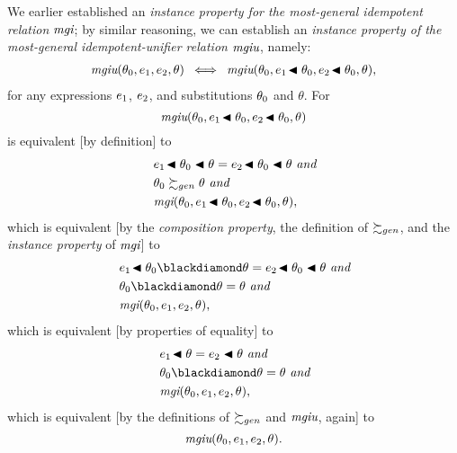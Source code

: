 \documentclass[runningheads]{llncs}
\DeclareMathOperator{\uand}{\emph{and}\,}
\DeclareMathOperator{\uiff}{\iff}
\DeclareMathOperator{\mgi}{\emph{mgi}}
\DeclareMathOperator{\mgiu}{\emph{mgiu}}
\begin{document}
We earlier established an \emph{instance property for the most-general idempotent relation} ${\mgi}$; by similar reasoning, we can establish an \emph{instance property of the most-general idempotent-unifier relation \emph{$\mgiu$}}, namely:
   \begin{align*}
 {\mgiu}(\thet{0}, \e{1}, \e{2}, \theta) \,\, \uiff \,\, 
  {\mgiu}(\thet{0}, \e{1}\!\apply\thet{0}, \e{2}\!\apply\thet{0}, \theta),
 \end{align*}
for any expressions $e_{1}$, $e_{2}$, and substitutions $\theta_{0}$ and $\theta$. For
\[ {\mgiu}(\thet{0}, \e{1}\!\apply\thet{0}, \e{2}\!\apply\thet{0}, \theta)\]
\noindent is equivalent [by definition] to
\[\begin{aligned}
&\e{1}\!\apply\thet{0}\apply \theta = \e{2}\!\apply\thet{0} \apply \theta \, \uand 
 \\
 \,\, & \thet{0} \moregen \theta \, \uand
\\
  \,\, & {\mgi}(\thet{0}, \e{1}\!\apply\thet{0}, \e{2}\!\apply\thet{0}, \theta),
\end{aligned}\]
\noindent which is equivalent [by the \emph{composition property}, the definition of $\succsim_{gen}$, and the \emph{instance property} of $\mgi$] to
\[\begin{aligned}
&\e{1}\!\apply\thet{0}\compose \theta = \e{2} \!\apply\thet{0}\apply \theta \, \uand 
 \\
 \,\, & \thet{0} \compose \theta = \theta \, \uand
\\
  \,\, & {\mgi}(\thet{0}, \e{1}, \e{2}, \theta),
\end{aligned}\]
\noindent which is equivalent [by properties of equality] to
\[\begin{aligned}
&\e{1}\!\apply \theta = \e{2} \apply \theta \, \uand 
 \\
 \,\, & \thet{0} \compose \theta = \theta \, \uand
\\
  \,\, & {\mgi}(\thet{0}, \e{1}, \e{2}, \theta),
\end{aligned}\]
\noindent which is equivalent [by the definitions of $\succsim_{gen}$ and $\mgiu$, again]  to
\[{\mgiu}(\thet{0}, \e{1}, \e{2}, \theta).\]
\end{document}
